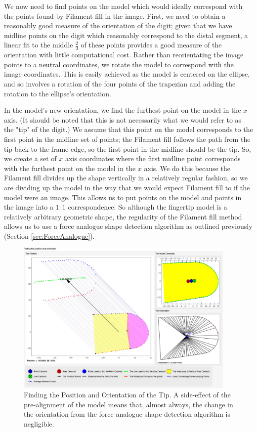 We now need to find points on the model which would ideally correspond with the points found by Filament fill in the image. First, we need to obtain a reasonably good measure of the orientation of the digit; given that we have midline points on the digit which reasonably correspond to the distal segment, a linear fit to the middle $\frac{2}{3}$ of these points provides a good measure of the orientation with little computational cost. Rather than reorientating the image points to a neutral coordinates, we rotate the model to correspond with the image coordinates. This is easily achieved as the model is centered on the ellipse, and so involves a rotation of the four points of the trapezian and adding the rotation to the ellipse's orientation.

In the model's new orientation, we find the furthest point on the model in the $x$ axis. (It should be noted that this is not necessarily what we would refer to as the "tip" of the digit.) We assume that this point on the model corresponds to the first point in the midline set of points; the Filament fill follows the path from the tip back to the frame edge, so the first point in the midline should be the tip. So, we create a set of $x$ axis coordinates where the first midline point corresponds with the furthest point on the model in the $x$ axis. We do this because the Filament fill divides up the shape vertically in a relatively regular fashion, so we are dividing up the model in the way that we would expect Filament fill to if the model were an image. This allows us to put points on the model and points in the image into a $1:1$ correspondence. So although the fingertip model is a relatively arbitrary geometric shape, the regularity of the Filament fill method allows us to use a force analogue shape detection algorithm as outlined previously (Section \ref{sec:ForceAnalogue}).

\begin{figure}[h!]
  \centering
    \includegraphics[width=0.95\textwidth]{Chapter4/Figs/Model_Centroids_With_Pos_Orientation.jpg}
    \caption{Finding the Position and Orientation of the Tip. A side-effect of the pre-alignment of the model means that, almost always,  the change in the orientation from the force analogue shape detection algorithm is negligible. }\label{fig:PositionAndOrientation}
\end{figure}

